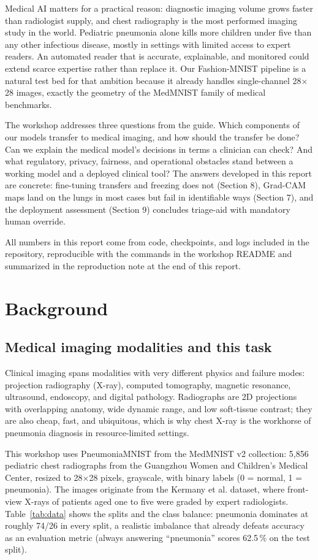\documentclass[11pt,a4paper]{article}
\begin{document}
Medical AI matters for a practical reason: diagnostic imaging volume grows faster than radiologist supply, and chest radiography is the most performed imaging study in the world. Pediatric pneumonia alone kills more children under five than any other infectious disease, mostly in settings with limited access to expert readers. An automated reader that is accurate, explainable, and monitored could extend scarce expertise rather than replace it. Our Fashion-MNIST pipeline is a natural test bed for that ambition because it already handles single-channel 28$\times$28 images, exactly the geometry of the MedMNIST family of medical benchmarks.

The workshop addresses three questions from the guide. Which components of our models transfer to medical imaging, and how should the transfer be done? Can we explain the medical model's decisions in terms a clinician can check? And what regulatory, privacy, fairness, and operational obstacles stand between a working model and a deployed clinical tool? The answers developed in this report are concrete: fine-tuning transfers and freezing does not (Section 8), Grad-CAM maps land on the lungs in most cases but fail in identifiable ways (Section 7), and the deployment assessment (Section 9) concludes triage-aid with mandatory human override.

All numbers in this report come from code, checkpoints, and logs included in the repository, reproducible with the commands in the workshop README and summarized in the reproduction note at the end of this report.

\section{Background}

\subsection{Medical imaging modalities and this task}

Clinical imaging spans modalities with very different physics and failure modes: projection radiography (X-ray), computed tomography, magnetic resonance, ultrasound, endoscopy, and digital pathology. Radiographs are 2D projections with overlapping anatomy, wide dynamic range, and low soft-tissue contrast; they are also cheap, fast, and ubiquitous, which is why chest X-ray is the workhorse of pneumonia diagnosis in resource-limited settings.

This workshop uses PneumoniaMNIST from the MedMNIST v2 collection: 5{,}856 pediatric chest radiographs from the Guangzhou Women and Children's Medical Center, resized to 28$\times$28 pixels, grayscale, with binary labels (0 = normal, 1 = pneumonia). The images originate from the Kermany et al. dataset, where front-view X-rays of patients aged one to five were graded by expert radiologists. Table~\ref{tab:data} shows the splits and the class balance: pneumonia dominates at roughly 74/26 in every split, a realistic imbalance that already defeats accuracy as an evaluation metric (always answering ``pneumonia'' scores 62.5\,\% on the test split).
\end{document}
